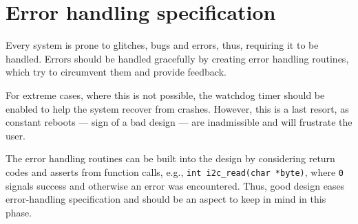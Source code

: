 \section{Error handling specification}
\label{sec:error-handling-specification}
Every system is prone to glitches, bugs and errors, thus, requiring it to be
handled. Errors should be handled gracefully by creating error handling
routines, which try to circumvent them and provide feedback.

For extreme cases, where this is not possible, the watchdog timer should be
enabled to help the system recover from crashes. However, this is a last resort,
as constant reboots --- sign of a bad design --- are inadmissible and will
frustrate the user.

The error handling routines can be built into the design by considering return
codes and asserts from function calls, e.g., \texttt{int i2c\_read(char *byte)},
where \texttt{0} signals success and otherwise an error was encountered. Thus,
good design eases error-handling specification and should be an aspect to keep
in mind in this phase.
%
  \vspace{-5mm}
